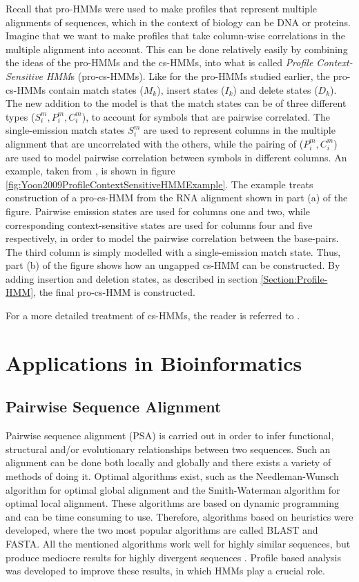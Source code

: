 \documentclass{article}\usepackage[]{graphicx}\usepackage[]{color}
\begin{document}
Recall that pro-HMMs were used to make profiles that represent multiple alignments of sequences, which in the context of biology can be DNA or proteins. Imagine that we want to make profiles that take column-wise correlations in the multiple alignment into account. This can be done relatively easily by combining the ideas of the pro-HMMs and the cs-HMMs, into what is called \textit{Profile Context-Sensitive HMM}s (pro-cs-HMMs). Like for the pro-HMMs studied earlier, the pro-cs-HMMs contain match states ($M_k$), insert states ($I_k$) and delete states ($D_k$). The new addition to the model is that the match states can be of three different types ($S_i^m, P_i^m, C_i^m$), to account for symbols that are pairwise correlated. The single-emission match states $S_i^m$ are used to represent columns in the multiple alignment that are uncorrelated with the others, while the pairing of ($P_i^m, C_i^m$) are used to model pairwise correlation between symbols in different columns. An example, taken from \cite{Yoon2009}, is shown in figure \ref{fig:Yoon2009ProfileContextSensitiveHMMExample}. The example treats construction of a pro-cs-HMM from the RNA alignment shown in part (a) of the figure. Pairwise emission states are used for columns one and two, while corresponding context-sensitive states are used for columns four and five respectively, in order to model the pairwise correlation between the base-pairs. The third column is simply modelled with a single-emission match state. Thus, part (b) of the figure shows how an ungapped cs-HMM can be constructed. By adding insertion and deletion states, as described in section \ref{Section:Profile-HMM}, the final pro-cs-HMM is constructed. 

For a more detailed treatment of cs-HMMs, the reader is referred to \cite{Yoon2006}.

\section{Applications in Bioinformatics}

\subsection{Pairwise Sequence Alignment}\label{Section:PairwiseSequenceAlignment}
Pairwise sequence alignment (PSA) is carried out in order to infer functional, structural and/or evolutionary relationships between two sequences. Such an alignment can be done both locally and globally and there exists a variety of methods of doing it. Optimal algorithms exist, such as the Needleman-Wunsch algorithm for optimal global alignment and the Smith-Waterman algorithm for optimal local alignment. These algorithms are based on dynamic programming and can be time consuming to use. Therefore, algorithms based on heuristics were developed, where the two most popular algorithms are called BLAST and FASTA. All the mentioned algorithms work well for highly similar sequences, but produce mediocre results for highly divergent sequences \cite{Choo2004}. Profile based analysis was developed to improve these results, in which HMMs play a crucial role. 
\end{document}
